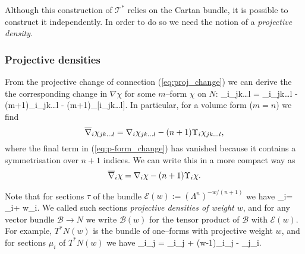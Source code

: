 Although this construction of $\mathcal{T}^*$ relies on the Cartan bundle, it is possible to construct it independently. In order to do so we need the notion of a \textit{projective density}.%
\subsubsection{Projective densities}
From the projective change of connection (\ref{eq:proj_change}) we can derive the the corresponding change in $\nabla\chi$ for some $m$--form $\chi$ on $N$:
\be \label{eq:p-form_change}
\ov{\nabla}_i\chi_{jk\dots l} = \nabla_i\chi_{jk\dots l} - (m+1)\Upsilon_i\chi_{jk\dots l} - (m+1)\Upsilon_{[i}\chi_{jk\dots l]}.
\ee
In particular, for a volume form ($m=n$) we find
\[
\overline{\nabla}_i\chi_{jk\dots l} = \nabla_i\chi_{jk\dots l} - (n+1)\Upsilon_i\chi_{jk\dots l},
\]
where the final term in (\ref{eq:p-form_change}) has vanished because it contains a symmetrisation over $n+1$ indices. We can write this in a more compact way as
\[
\overline{\nabla}_i\chi = \nabla_i\chi - (n+1)\Upsilon_i\chi.
\]

Note that for sections $\tau$ of the bundle $\mathcal{E}(w):=(\Lambda^n)^{-w/(n+1)}$ we have
\be \label{eq:ddensity_change}
\ov{\nabla}_i\tau = \nabla_i\tau + w\Upsilon_i\tau.
\ee
We called such sections \textit{projective densities of weight $w$}, and for any vector bundle $\mathcal{B}\rightarrow N$ we write $\mathcal{B}(w)$ for the tensor product of $\mathcal{B}$ with $\mathcal{E}(w)$. For example, $T^*N(w)$ is the bundle of one--forms with projective weight $w$, and for sections $\mu_i$ of $T^*N(w)$ we have
\be \label{eq:dweighted_form_change}
\ov{\nabla}_i\mu_j = \nabla_i\mu_j + (w-1)\Upsilon_i\mu_j - \Upsilon_j\mu_i.
\ee

